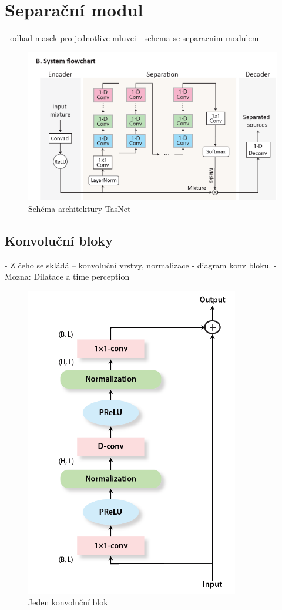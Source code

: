 \section{Separační modul}
- odhad masek pro jednotlive mluvci
- schema se separacnim modulem
\begin{figure}[H]
    \centering
    \includegraphics[scale=0.6]{obrazky-figures/tasnet-architecture.png}
    \caption{\label{fig:tasnet-modul}Schéma architektury TasNet}
\end{figure}


\subsection{Konvoluční bloky}
- Z čeho se skládá -- konvoluční vrstvy, normalizace
- diagram konv bloku.
- Mozna: Dilatace a time perception
\begin{figure}[H]
    \centering
    \includegraphics[scale=0.5]{obrazky-figures/conv-res-block.png}
    \caption{\label{fig:tasnet-convblock}Jeden konvoluční blok}
\end{figure}

